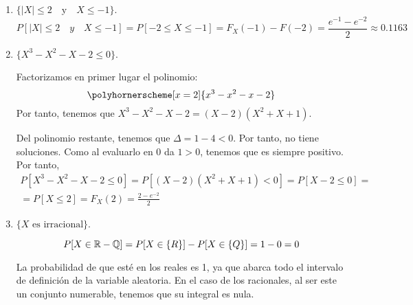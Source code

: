 \begin{ejercicio}
\begin{enumerate}
        \item $\{|X|\leq 2 \quad \text{y} \quad X\leq -1\}$.
        \begin{equation*}
            P[|X|\leq 2\quad y \quad X\leq -1] = P[-2 \leq X\leq -1] = F_X(-1) - F(-2)=\frac{e^{-1}-e^{-2}}{2} \approx 0.1163
        \end{equation*}
        
        \item $\{X^3 - X^2 - X-2 \leq 0\}$.

        Factorizamos en primer lugar el polinomio:
        \begin{equation*}
            \polyhornerscheme[x=2]{x^3-x^2-x-2}
        \end{equation*}
        Por tanto, tenemos que $X^3-X^2-X-2 = (X-2)(X^2+X+1)$.
        
        Del polinomio restante, tenemos que $\Delta=1-4<0$. Por tanto, no tiene soluciones. Como al evaluarlo en 0 da $1>0$, tenemos que es siempre positivo. Por tanto,
        \begin{multline*}
            P[X^3 - X^2 - X-2 \leq 0] = P[(X-2)(X^2+X+1)<0]
            = P[X-2\leq 0]
            =\\= P[X\leq 2] = F_X(2) = \frac{2-e^{-2}}{2}
        \end{multline*}
        
        
        \item $\{X \text{ es irracional}\}$.

        \begin{equation*}
            P[X\in \mathbb{R}-\mathbb{Q}] = P[X\in \mathbb\{R\}] - P[X\in \mathbb\{Q\}] = 1-0 = 0
        \end{equation*}

        La probabilidad de que esté en los reales es 1, ya que abarca todo el intervalo de definición de la variable aleatoria. En el caso de los racionales, al ser este un conjunto numerable, tenemos que su integral es nula.
    \end{enumerate}
\end{ejercicio}



